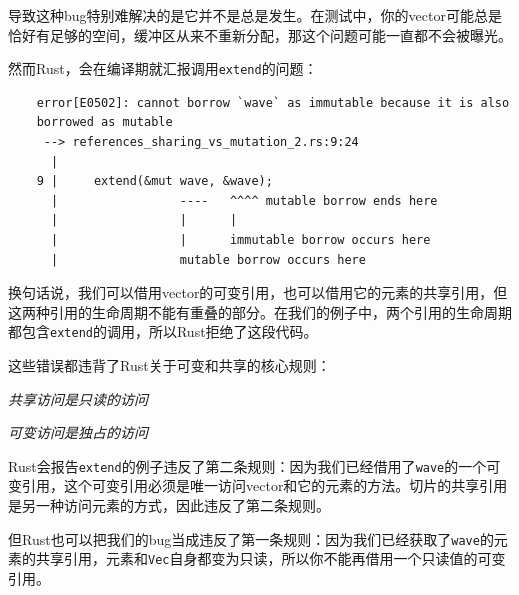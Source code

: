 
导致这种bug特别难解决的是它并不是总是发生。在测试中，你的vector可能总是恰好有足够的空间，缓冲区从来不重新分配，那这个问题可能一直都不会被曝光。

然而Rust，会在编译期就汇报调用\texttt{extend}的问题：
\begin{verbatim}
    error[E0502]: cannot borrow `wave` as immutable because it is also
    borrowed as mutable
     --> references_sharing_vs_mutation_2.rs:9:24
      |
    9 |     extend(&mut wave, &wave);
      |                 ----   ^^^^ mutable borrow ends here
      |                 |      |
      |                 |      immutable borrow occurs here
      |                 mutable borrow occurs here
\end{verbatim}

换句话说，我们可以借用vector的可变引用，也可以借用它的元素的共享引用，但这两种引用的生命周期不能有重叠的部分。在我们的例子中，两个引用的生命周期都包含\texttt{extend}的调用，所以Rust拒绝了这段代码。

这些错误都违背了Rust关于可变和共享的核心规则：

\begin{flushleft}
    \emph{共享访问是只读的访问}
\end{flushleft}


\begin{flushleft}
    \emph{可变访问是独占的访问}
\end{flushleft}


Rust会报告\texttt{extend}的例子违反了第二条规则：因为我们已经借用了\texttt{wave}的一个可变引用，这个可变引用必须是唯一访问vector和它的元素的方法。切片的共享引用是另一种访问元素的方式，因此违反了第二条规则。

但Rust也可以把我们的bug当成违反了第一条规则：因为我们已经获取了\texttt{wave}的元素的共享引用，元素和\texttt{Vec}自身都变为只读，所以你不能再借用一个只读值的可变引用。


